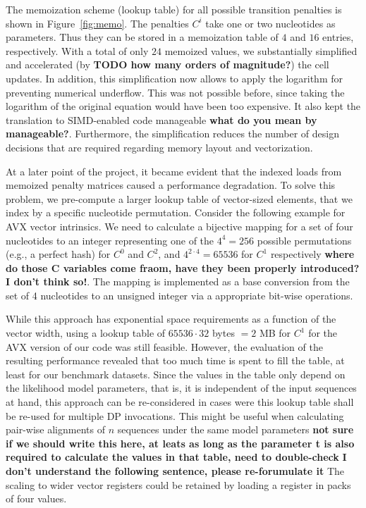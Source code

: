 \documentclass[runningheads,a4paper]{llncs}
\begin{document}
The memoization scheme (lookup table) for all possible transition penalties is shown in Figure~\ref{fig:memo}. 
The penalties $C^i$ take one or two nucleotides as parameters.
Thus they can be stored in a memoization table of $4$ and $16$ entries, respectively. 
With a total of only $24$ memoized values, we substantially simplified and accelerated (by {\bf TODO how many orders of magnitude?}) the cell updates.
In addition, this simplification now allows to apply the logarithm for preventing numerical underflow.
This was not possible before, since taking the logarithm of the original equation would have been too expensive. 
It also kept the translation to SIMD-enabled code manageable {\bf what do you mean by manageable?}.
Furthermore, the simplification reduces the number of design decisions that are required regarding 
memory layout and vectorization.

At a later point of the project, it became evident that the indexed loads from memoized penalty matrices caused a performance degradation. 
To solve this problem, we pre-compute a larger lookup table of vector-sized elements, that we index by a specific nucleotide permutation. 
Consider the following example for AVX vector intrinsics.
We need to calculate a bijective mapping for a set of four nucleotides to an integer representing one of the $4^4 = 256$ possible permutations (e.g., a perfect hash) 
for $C^0$ and $C^2$, and $4^{2 \cdot 4} = 65536$ for $C^1$ respectively {\bf where do those C variables come fraom, have they been properly introduced? I don't think so!}. 
The mapping is implemented as a base conversion from the set of 4 nucleotides to an unsigned integer via a appropriate bit-wise operations.

While this approach has exponential space requirements as a function of the vector width, using a lookup table of $65536 \cdot 32$ bytes $= 2$ MB for $C^1$ for 
the AVX version of our code was still feasible. 
However, the evaluation of the resulting performance revealed that too much time is spent to fill the table, at least for our benchmark datasets. 
Since the values in the table only depend on the likelihood model parameters, that is, it is independent of the input sequences at hand, 
this approach can be re-considered in cases were this lookup table shall be re-used for multiple DP invocations. 
This might be useful when calculating pair-wise alignments of $n$ sequences under the same model parameters 
{\bf not sure if we should write this here, at leats as long as the parameter t is also required to calculate the values in that table, need to double-check}
{\bf I don't understand the following sentence, please re-forumulate it} The scaling to wider vector registers could be retained by loading a register in packs of four values.
\end{document}
